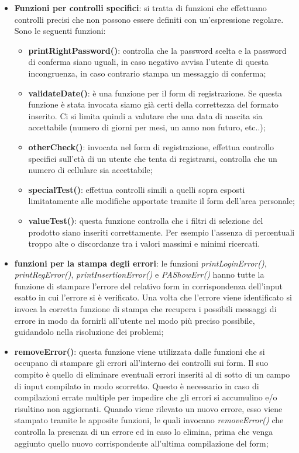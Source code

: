 \begin{itemize}
    \item \textbf{Funzioni per controlli specifici}: si tratta di funzioni che effettuano controlli precisi che non possono essere definiti con un'espressione regolare. Sono le seguenti funzioni:
    \begin{itemize}
        \item \textbf{printRightPassword()}: controlla che la password scelta e la password di conferma siano uguali, in caso negativo avvisa l'utente di questa incongruenza, in caso contrario stampa un messaggio di conferma;
        \item \textbf{validateDate()}: è una funzione per il form di registrazione. Se questa funzione è stata invocata siamo già certi della correttezza del formato inserito. Ci si limita quindi a valutare che una data di nascita sia accettabile (numero di giorni per mesi, un anno non futuro, etc..);
        \item \textbf{otherCheck()}: invocata nel form di registrazione, effettua controllo specifici sull'età di un utente che tenta di registrarsi, controlla che un numero di cellulare sia accettabile;
        \item \textbf{specialTest()}: effettua controlli simili a quelli sopra esposti limitatamente alle modifiche apportate tramite il form dell'area personale;
        \item \textbf{valueTest()}: questa funzione controlla che i filtri di selezione del prodotto siano inseriti correttamente. Per esempio l'assenza di percentuali troppo alte o discordanze tra i valori massimi e minimi ricercati.
    \end{itemize}
    
    \item \textbf{funzioni per la stampa degli errori}: le funzioni \textit{printLoginError()}, \textit{printRegError()}, \textit{printInsertionError()} e \textit{PAShowErr()} hanno tutte la funzione di stampare l'errore del relativo form in corrispondenza dell'input esatto in cui l'errore si è verificato. Una volta che l'errore viene identificato si invoca la corretta funzione di stampa che recupera i possibili messaggi di errore in modo da fornirli all'utente nel modo più preciso possibile, guidandolo nella risoluzione dei problemi;
    
    \item \textbf{removeError()}: questa funzione viene utilizzata dalle funzioni che si occupano di stampare gli errori all'interno dei controlli sui form. Il suo compito è quello di eliminare eventuali errori inseriti al di sotto di un campo di input compilato in modo scorretto. Questo è necessario in caso di compilazioni errate multiple per impedire che gli errori si accumulino e/o risultino non aggiornati. Quando viene rilevato un nuovo errore, esso viene stampato tramite le apposite funzioni, le quali invocano \textit{removeError()} che controlla la presenza di un errore ed in caso lo elimina, prima che venga aggiunto quello nuovo corrispondente all'ultima compilazione del form;
    

\end{itemize}
